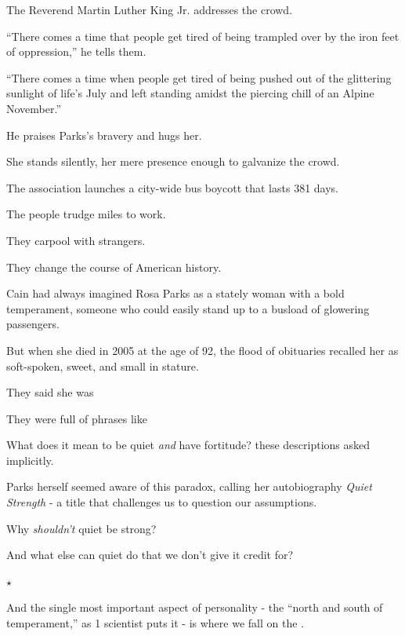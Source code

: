 \documentclass[oneside]{article}
\numberwithin{equation}{section}
\begin{document}
The Reverend Martin Luther King Jr. addresses the crowd.

``There comes a time that people get tired of being trampled over by the iron feet of oppression,'' he tells them.

``There comes a time when people get tired of being pushed out of the glittering sunlight of life's July and left standing amidst the piercing chill of an Alpine November.''

%
He praises Parks's bravery and hugs her.

She stands silently, her mere presence enough to galvanize the crowd.

The association launches a city-wide bus boycott that lasts 381 days.

The people trudge miles to work.

They carpool with strangers.

They change the course of American history.

%
Cain had always imagined Rosa Parks as a stately woman with a bold temperament, someone who could easily stand up to a busload of glowering passengers.

But when she died in 2005 at the age of 92, the flood of obituaries recalled her as soft-spoken, sweet, and small in stature.

They said she was 

They were full of phrases like 

What does it mean to be quiet \textit{and} have fortitude? these descriptions asked implicitly.


%
Parks herself seemed aware of this paradox, calling her autobiography \textit{Quiet Strength} - a title that challenges us to question our assumptions.

Why \textit{shouldn't} quiet be strong?

And what else can quiet do that we don't give it credit for?
\begin{center}
    $\star$
\end{center}

And the single most important aspect of personality - the ``north and south of temperament,'' as 1 scientist puts it - is where we fall on the .
\end{document}
